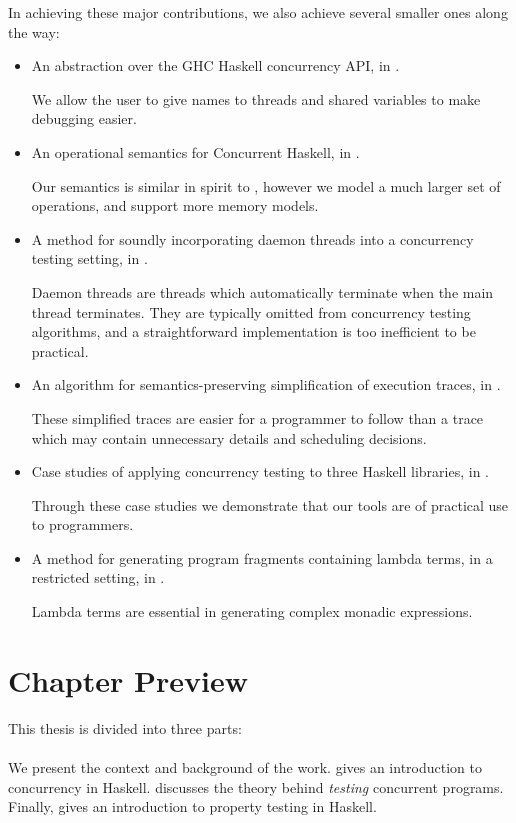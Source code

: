 In achieving these major contributions, we also achieve several
smaller ones along the way:

\begin{itemize}
\item An abstraction over the GHC Haskell concurrency API, in
  .

  We allow the user to give names to threads and shared variables to
  make debugging easier.
\item An operational semantics for Concurrent Haskell, in
  .

  Our semantics is similar in spirit to \cite{vollmer2017}, however we
  model a much larger set of operations, and support more memory
  models.
\item A method for soundly incorporating daemon threads into a
  concurrency testing setting, in .

  Daemon threads are threads which automatically terminate when the
  main thread terminates.  They are typically omitted from concurrency
  testing algorithms, and a straightforward implementation is too
  inefficient to be practical.
\item An algorithm for semantics-preserving simplification of
  execution traces, in .

  These simplified traces are easier for a programmer to follow than a
  trace which may contain unnecessary details and scheduling
  decisions.
\item Case studies of applying concurrency testing to three Haskell
  libraries, in .

  Through these case studies we demonstrate that our tools are of
  practical use to programmers.
\item A method for generating program fragments containing lambda
  terms, in a restricted setting, in .

  Lambda terms are essential in generating complex monadic
  expressions.
\end{itemize}

\section{Chapter Preview}
\label{sec:intro-roadmap}

This thesis is divided into three parts:

\paragraph{}
We present the context and background of the work.
 gives an introduction to concurrency in
Haskell.   discusses the theory behind \emph{testing}
concurrent programs.  Finally,  gives an
introduction to property testing in Haskell.

